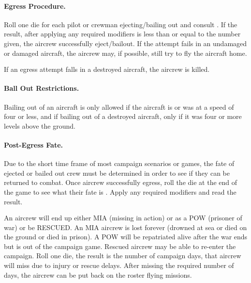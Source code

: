 \begin{advancedrules}
{\paragraph{Egress Procedure.} Roll one die for each pilot or crewman ejecting/bailing out and consult . If the result, after applying any required modifiers is less than or equal to the number given, the aircrew successfully eject/bailout.  If the attempt fails in an undamaged or damaged aircraft, the aircrew may, if possible, still try to fly the aircraft home.

If an egress attempt falls in a destroyed aircraft, the aircrew is killed.

\paragraph{Ball Out Restrictions.} Bailing out of an aircraft is only allowed if the aircraft is or was at a speed of four or less, and if bailing out of a destroyed aircraft, only if it was four or more levels above the ground. 


\paragraph{Post-Egress Fate.\label{rule:post-egress-fate}} Due to the short time frame of most campaign scenarios or games, the fate of ejected or bailed out crew must be determined in order to see if they can be returned to combat. Once aircrew successfully egress, roll the die at the end of the game to see what their fate is . Apply any required modifiers and read the result.

An aircrew will end up either MIA (missing in action) or as a POW (prisoner of war) or be RESCUED. An MIA aircrew is lost forever (drowned at sea or died on the ground or died in prison). A POW will be repatriated alive after the war ends but is out of the campaign game. Rescued aircrew may be able to re-enter the campaign. Roll one die, the result is the number of campaign days, that aircrew will miss due to injury or rescue delays. After missing the required number of days, the aircrew can be put back on the roster flying missions.

}
\end{advancedrules}
